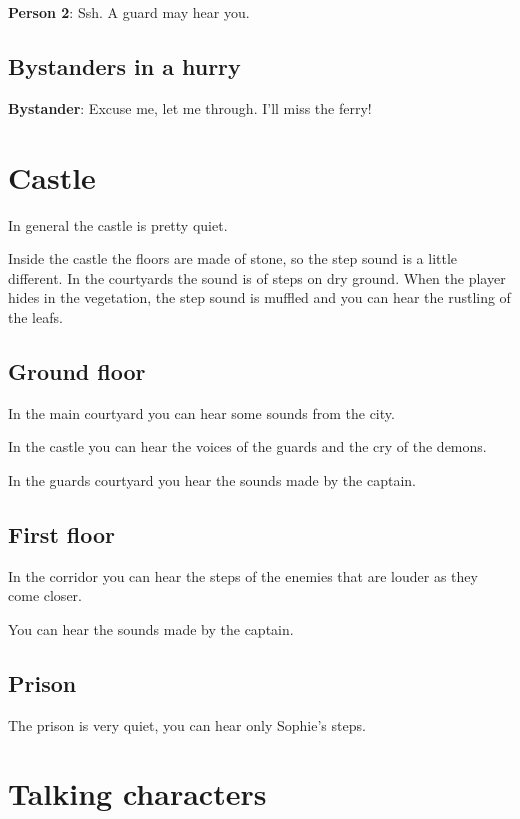 \textbf{Person 2}: Ssh. A guard may hear you.

\subsection{Bystanders in a hurry}
\textbf{Bystander}: Excuse me, let me through. I'll miss the ferry!

\section{Castle}

In general the castle is pretty quiet.

Inside the castle the floors are made of stone, so the step sound is a little different. In the courtyards the sound is of steps on dry ground. When the player hides in the vegetation, the step sound is muffled and you can hear the rustling of the leafs.

\subsection{Ground floor}
In the main courtyard you can hear some sounds from the city.

In the castle you can hear the voices of the guards and the cry of the demons.

In the guards courtyard you hear the sounds made by the captain.

\subsection{First floor}
In the corridor you can hear the steps of the enemies that are louder as they come closer.

You can hear the sounds made by the captain.

\subsection{Prison}
The prison is very quiet, you can hear only Sophie's steps.

\section{Talking characters}

